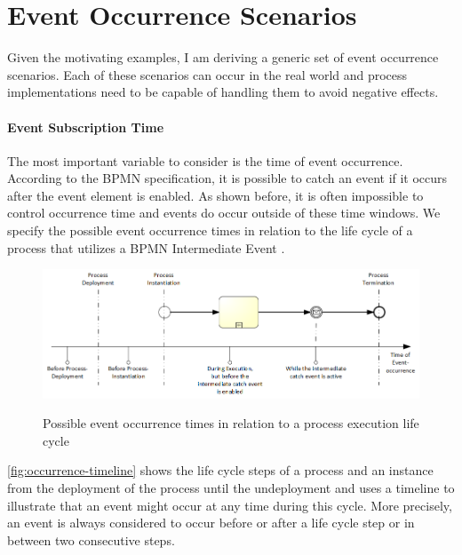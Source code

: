 \section{Event Occurrence Scenarios}
Given the motivating examples, I am deriving a generic set of event occurrence scenarios. Each of these scenarios can occur in the real world and process implementations need to be capable of handling them to avoid negative effects.

\paragraph{Event Subscription Time}

The most important variable to consider is the time of event occurrence. 
According to the BPMN specification, it is possible to catch an event if it occurs after the event element is enabled. As shown before, it is often impossible to control occurrence time and events do occur outside of these time windows.
We specify the possible event occurrence times in relation to the life cycle of a process that utilizes a BPMN Intermediate Event .
\begin{figure}[]
	\myfloatalign
	{\includegraphics[width=1\linewidth]{chapters/requirements/timeline-event-occurrence.png}}
	\caption{Possible event occurrence times in relation to a process execution life cycle}\label{fig:occurrence-timeline}
\end{figure}

\autoref{fig:occurrence-timeline} shows the life cycle steps of a process and an instance from the deployment of the process until the undeployment and uses a timeline to illustrate that an event might occur at any time during this cycle. More precisely, an event is always considered to occur before or after a life cycle step or in between two consecutive steps.

